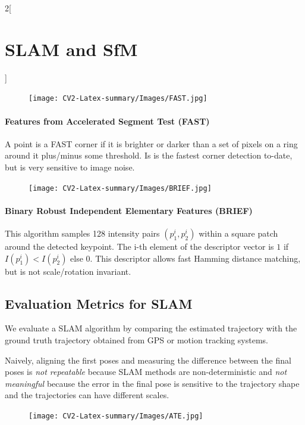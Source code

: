 \documentclass[oneside,fontsize=11pt,paper=a4]{scrartcl}
\begin{document}
\begin{multicols}{2}[\section{SLAM and SfM}]
\begin{figure}
    \texttt{[image: CV2-Latex-summary/Images/FAST.jpg]}
\end{figure}
\paragraph{Features from Accelerated Segment Test (FAST)} A point is a FAST corner if it is brighter or darker than a set of pixels on a ring around it plus/minus some threshold. Is is the fastest corner detection to-date, but is very sensitive to image noise.

\begin{figure}
    \texttt{[image: CV2-Latex-summary/Images/BRIEF.jpg]}
\end{figure}
\paragraph{Binary Robust Independent Elementary Features (BRIEF)} This algorithm samples 128 intensity pairs $(p^i_1,p^i_2)$ within a square patch around the detected keypoint. The i-th element of the descriptor vector is $1$ if $I(p^i_1)<I(p^i_2)$ else $0$. This descriptor allows fast Hamming distance matching, but is not scale/rotation invariant.

\subsection{Evaluation Metrics for SLAM}

We evaluate a SLAM algorithm by comparing the estimated trajectory with the ground truth trajectory obtained from GPS or motion tracking systems.

Naively, aligning the first poses and measuring the difference between the final poses is \textit{not repeatable} because SLAM methods are non-deterministic and \textit{not meaningful} because the error in the final pose is sensitive to the trajectory shape and the trajectories can have different scales.

\begin{figure}
    \texttt{[image: CV2-Latex-summary/Images/ATE.jpg]}
\end{figure}

\end{multicols}
\end{document}
